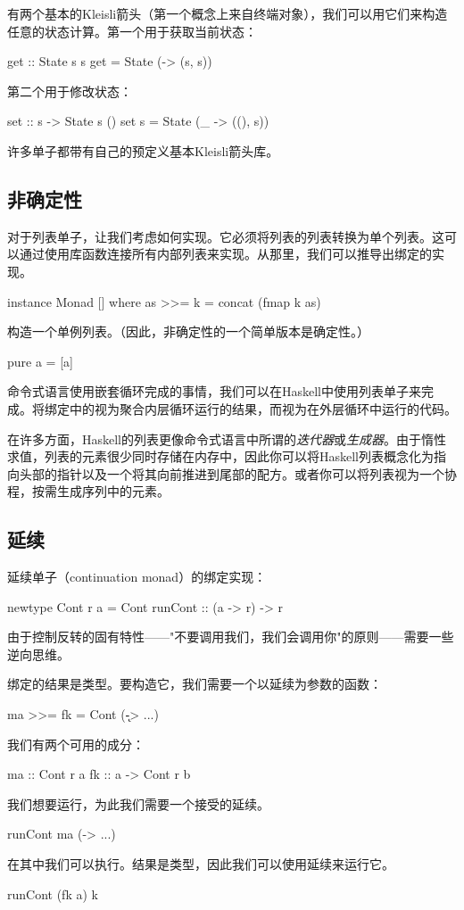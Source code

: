 \documentclass[DaoFP]{subfiles}
\begin{document}
有两个基本的Kleisli箭头（第一个概念上来自终端对象\hask{()}），我们可以用它们来构造任意的状态计算。第一个用于获取当前状态：
\begin{haskell}
get :: State s s
get = State (\s -> (s, s))
\end{haskell}
第二个用于修改状态：
\begin{haskell}
set :: s -> State s ()
set s = State (\_ -> ((), s))
\end{haskell}
许多单子都带有自己的预定义基本Kleisli箭头库。

\subsection{非确定性}

对于列表单子，让我们考虑如何实现。它必须将列表的列表转换为单个列表。这可以通过使用库函数连接所有内部列表来实现。从那里，我们可以推导出绑定的实现。
\begin{haskell}
instance Monad [] where
  as >>= k = concat (fmap k as)
\end{haskell}
构造一个单例列表。（因此，非确定性的一个简单版本是确定性。）
\begin{haskell}
  pure a = [a]
\end{haskell}

命令式语言使用嵌套循环完成的事情，我们可以在Haskell中使用列表单子来完成。将绑定中的视为聚合内层循环运行的结果，而视为在外层循环中运行的代码。

在许多方面，Haskell的列表更像命令式语言中所谓的\emph{迭代器}或\emph{生成器}。由于惰性求值，列表的元素很少同时存储在内存中，因此你可以将Haskell列表概念化为指向头部的指针以及一个将其向前推进到尾部的配方。或者你可以将列表视为一个协程，按需生成序列中的元素。

\subsection{延续}

延续单子（continuation monad）的绑定实现：
\begin{haskell}
newtype Cont r a = Cont { runCont :: (a -> r) -> r }
\end{haskell}
由于控制反转的固有特性——"不要调用我们，我们会调用你"的原则——需要一些逆向思维。

绑定的结果是类型。要构造它，我们需要一个以延续为参数的函数：
\begin{haskell}
ma >>= fk = Cont (\k -> ...)
\end{haskell}
我们有两个可用的成分：
\begin{haskell}
ma :: Cont r a
fk :: a -> Cont r b
\end{haskell}
我们想要运行，为此我们需要一个接受的延续。
\begin{haskell}
runCont ma (\a -> ...)
\end{haskell}
在其中我们可以执行。结果是类型，因此我们可以使用延续来运行它。
\begin{haskell}
runCont (fk a) k
\end{haskell}
\end{document}
